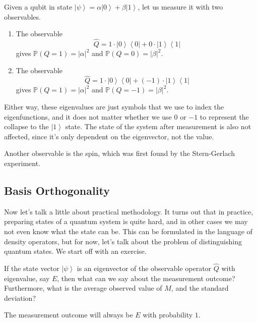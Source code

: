 \documentclass{article}
\newcommand{\ket}[1]{\ensuremath{\left|#1\right\rangle}}
\newcommand{\bra}[1]{\ensuremath{\left\langle#1\right|}}
\begin{document}
    \begin{example}
      Given a qubit in state $\ket{\psi} = \alpha \ket{0} + \beta \ket{1}$, let us measure it with two observables. 
      \begin{enumerate} 
        \item The observable 
          \begin{equation} 
            \hat{Q} = 1 \cdot \ket{0}\bra{0} + 0 \cdot \ket{1}\bra{1}
          \end{equation}
          gives $\mathbb{P}(Q = 1) = |\alpha|^2$ and $\mathbb{P}(Q = 0) = |\beta|^2$. 

        \item The observable 
          \begin{equation} 
            \hat{Q} = 1 \cdot \ket{0}\bra{0} + (-1) \cdot \ket{1}\bra{1}
          \end{equation}
          gives $\mathbb{P}(Q = 1) = |\alpha|^2$ and $\mathbb{P}(Q = -1) = |\beta|^2$. 
      \end{enumerate}
      Either way, these eigenvalues are just symbols that we use to index the eigenfunctions, and it does not matter whether we use $0$ or $-1$ to represent the collapse to the $\ket{1}$ state. The state of the system after measurement is also not affected, since it's only dependent on the eigenvector, not the value. 
    \end{example}

    Another observable is the spin, which was first found by the Stern-Gerlach experiment. 

  \subsection{Basis Orthogonality}

    Now let's talk a little about practical methodology. It turns out that in practice, preparing states of a quantum system is quite hard, and in other cases we may not even know what the state can be. This can be formulated in the language of density operators, but for now, let's talk about the problem of distinguishing quantum states.  We start off with an exercise. 

    \begin{exercise}[Neilson 2.58]
      If the state vector $\ket{\psi}$ is an eigenvector of the observable operator $\hat{Q}$ with eigenvalue, say $E$, then what can we say about the measurement outcome? Furthermore, what is the average observed value of $M$, and the standard deviation? 
    \end{exercise}
    \begin{solution} 
      The measurement outcome will always be $E$ with probability $1$. 
    \end{solution}
\end{document}
